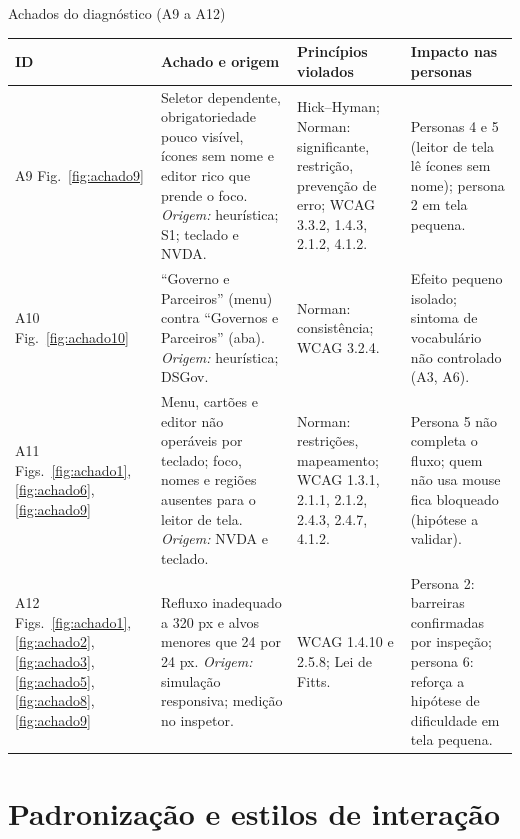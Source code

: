 \documentclass[
  12pt,
  oneside,
  a4paper,
  chapter=TITLE,
  section=TITLE,
  english,
  brazilian
]{abntex2}
\renewcommand{\fonte}[1]{\par\vspace{3pt}{\footnotesize\raggedright\noindent Fonte: #1\par}\vspace{4pt}}%
\begin{document}
\begin{quadro}[!htbp]
  \caption{Achados do diagnóstico (A9 a A12)}\label{qua:achados3}
  \centering\footnotesize
  \begin{tabularx}{\textwidth}{|P{1.3cm}|Y|Y|Y|}\hline
    ID & Achado e origem & Princípios violados & Impacto nas personas \\\hline
    A9 \newline Fig.~\ref{fig:achado9} & Seletor dependente, obrigatoriedade pouco visível, ícones sem nome e editor rico que prende o foco. \textit{Origem:} heurística; S1; teclado e NVDA. & Hick--Hyman; Norman: significante, restrição, prevenção de erro; WCAG 3.3.2, 1.4.3, 2.1.2, 4.1.2. & Personas 4 e 5 (leitor de tela lê ícones sem nome); persona 2 em tela pequena. \\\hline
    A10 \newline Fig.~\ref{fig:achado10} & ``Governo e Parceiros'' (menu) contra ``Governos e Parceiros'' (aba). \textit{Origem:} heurística; DSGov. & Norman: consistência; WCAG 3.2.4. & Efeito pequeno isolado; sintoma de vocabulário não controlado (A3, A6). \\\hline
    A11 \newline Figs.~\ref{fig:achado1}, \ref{fig:achado6}, \ref{fig:achado9} & Menu, cartões e editor não operáveis por teclado; foco, nomes e regiões ausentes para o leitor de tela. \textit{Origem:} NVDA e teclado. & Norman: restrições, mapeamento; WCAG 1.3.1, 2.1.1, 2.1.2, 2.4.3, 2.4.7, 4.1.2. & Persona 5 não completa o fluxo; quem não usa mouse fica bloqueado (hipótese a validar). \\\hline
    A12 \newline Figs.~\ref{fig:achado1}, \ref{fig:achado2}, \ref{fig:achado3}, \ref{fig:achado5}, \ref{fig:achado8}, \ref{fig:achado9} & Refluxo inadequado a 320 px e alvos menores que 24 por 24 px. \textit{Origem:} simulação responsiva; medição no inspetor. & WCAG 1.4.10 e 2.5.8; Lei de Fitts. & Persona 2: barreiras confirmadas por inspeção; persona 6: reforça a hipótese de dificuldade em tela pequena. \\\hline
  \end{tabularx}
  \fonte{Elaborado pelos autores (2026).}
\end{quadro}

\chapter{Padronização e estilos de interação}\label{cap:padronizacao}
\end{document}
